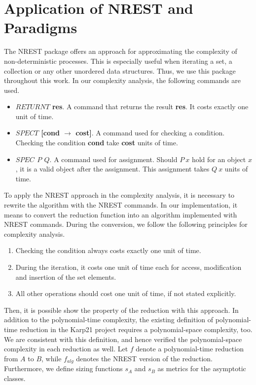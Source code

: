 \section{Application of NREST and Paradigms}
The NREST package offers an approach for approximating the complexity of non-deterministic processes.
This is especially useful when iterating a set, a collection or any other unordered data structures. Thus,
we use this package throughout this work. In our complexity analysis, the following commands are used. 
\begin{itemize}
    \item \textbf{$RETURNT$ res}. A command that returns the result \textbf{res}. It costs exactly one unit of time.
    \item \textbf{$SPECT$ [cond $\rightarrow$ cost]}. A command used for checking a condition. Checking the condition \textbf{cond}
    take \textbf{cost} units of time.
    \item \textbf{$SPEC$ $P$ $Q$}. A command used for assignment. 
    Should $P\ x$ hold for an object $x$, it is a valid object after the assignment.
    This assignment takes $Q\ x$ units of time.
\end{itemize}
To apply the NREST approach in the complexity analysis, it is necessary to rewrite the algorithm with the NREST commands.
In our implementation, it means to convert the reduction function into an algorithm implemented with NREST commands.
During the conversion, we follow the following principles for complexity analysis.
\begin{enumerate}
    \label{para1}
    \item Checking the condition always costs exactly one unit of time. 
    \item During the iteration, it costs one unit of time each for access, modification and insertion of the set elements.
    \item All other operations should cost one unit of time, if not stated explicitly.
\end{enumerate}
Then, it is possible show the property of the reduction with this approach. In addition to the polynomial-time complexity, 
the existing definition of polynomial-time reduction in the Karp21 project requires a polynomial-space complexity, too. 
We are consistent with this definition, and hence verified the polynomial-space complexity in each reduction as well.
Let $f$ denote a polynomial-time reduction from $A$ to $B$, while $f_{alg}$ denotes the NREST version of the reduction.
Furthermore, we define sizing functions $s_A$ and $s_B$ as metrics for the asymptotic classes.

